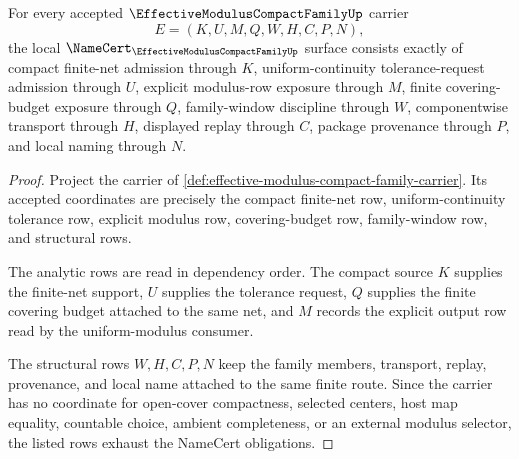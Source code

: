 \begin{theorem}
\label{thm:effective-modulus-compact-family-namecert-obligations}
For every accepted $\EffectiveModulusCompactFamilyUp$ carrier
$$
E=(K,U,M,Q,W,H,C,P,N),
$$
the local $\NameCert_{\EffectiveModulusCompactFamilyUp}$ surface consists exactly of compact finite-net admission through $K$, uniform-continuity tolerance-request admission through $U$, explicit modulus-row exposure through $M$, finite covering-budget exposure through $Q$, family-window discipline through $W$, componentwise transport through $H$, displayed replay through $C$, package provenance through $P$, and local naming through $N$.
\end{theorem}
\begin{proof}
Project the carrier of \autoref{def:effective-modulus-compact-family-carrier}. Its accepted coordinates are precisely the compact finite-net row, uniform-continuity tolerance row, explicit modulus row, covering-budget row, family-window row, and structural rows.

The analytic rows are read in dependency order. The compact source $K$ supplies the finite-net support, $U$ supplies the tolerance request, $Q$ supplies the finite covering budget attached to the same net, and $M$ records the explicit output row read by the uniform-modulus consumer.

The structural rows $W,H,C,P,N$ keep the family members, transport, replay, provenance, and local name attached to the same finite route. Since the carrier has no coordinate for open-cover compactness, selected centers, host map equality, countable choice, ambient completeness, or an external modulus selector, the listed rows exhaust the NameCert obligations.
\end{proof}

